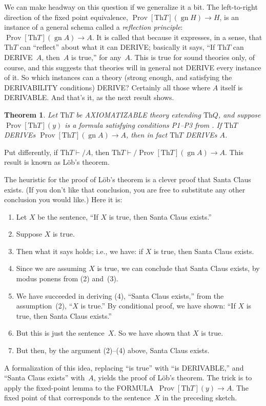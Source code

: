 \documentclass[10pt,a4paper]{article}
\makeatletter
\newcommand*{\olup}[1]{\MakeUppercase{#1}}
\theoremstyle{plain}
\newtheorem{thm}{Theorem}[section]
\theoremstyle{definition}
\theoremstyle{remark}
\newenvironment{explain}{}{}
\newcommand*{\ollabel}[1]{\label{#1}}
\newcommand{\olref}{\@ifnextchar[{\olref@i}{\olref@final}}
\def\olref@i[#1]{\@ifnextchar[{\olref@ii}{\olref@final}}
\def\olref@ii[#1]{\@ifnextchar[{\olref@iii}{\olref@final}}
\def\olref@iii[#1]{\olref@final}
\def\olref@final#1{\ref{#1}}
\providecommand{\lif}{\mathbin{\rightarrow}}
\providecommand{\Proves}{\mathrel{\vdash}}
\providecommand{\Th}{\ensuremath{\mathrm{Th}}}
\providecommand{\gn}{\operatorname{gn}}
\providecommand{\OProv}{\operatorname{Prov}}
\makeatother
\begin{document}
We can make headway on this question if we generalize it a bit. The
left-to-right direction of the fixed point equivalence,
$\OProv[\Th{T}](\gn{H}) \lif H$, is an instance of a general schema
called a \emph{reflection principle}: $\OProv[\Th{T}](\gn{A}) \lif A$.
It is called that because it expresses, in a sense, that $\Th{T}$ can
``reflect'' about what it can \olup{derive}; basically it says, ``If $\Th{T}$
can \olup{derive}~$A$, then~$A$ is true,'' for any~$A$.  This is true for
sound theories only, of course, and this suggests that theories will
in general not \olup{derive} every instance of it.  So which instances can a
theory (strong enough, and satisfying the \olup{derivability} conditions)
\olup{derive}?  Certainly all those where $A$ itself is \olup{derivable}. And that's
it, as the next result shows.

\begin{thm}\ollabel{thm:lob}
Let $\Th{T}$ be \olup{axiomatizable} theory extending $\Th{Q}$, and
suppose $\OProv[\Th{T}](y)$ is a formula satisfying conditions P1--P3 from
\olref[2in]{sec}. If $\Th{T}$ \olup{derive}s $\OProv[\Th{T}](\gn{A}) \lif A$,
then in fact $\Th{T}$ \olup{derive}s $A$.
\end{thm}

Put differently, if $\Th{T} \Proves/ A$, then $\Th{T} \Proves/
\OProv[\Th{T}](\gn{A}) \lif A$. This result is known as L\"ob's
theorem.

\begin{explain}
The heuristic for the proof of L\"ob's theorem is a clever proof that
Santa Claus exists. (If you don't like that conclusion, you are free
to substitute any other conclusion you would like.) Here it is:
\begin{enumerate}
\item Let $X$ be the sentence, ``If $X$ is true, then Santa Claus
  exists.''
\item Suppose $X$ is true.
\item Then what it says holds; i.e., we have: if $X$ is true, then
  Santa Claus exists.
\item Since we are assuming $X$ is true, we can conclude that
  Santa Claus exists, by modus ponens from (2) and~(3).
\item We have succeeded in deriving (4), ``Santa Claus exists,'' from
  the assumption~(2), ``$X$ is true.'' By conditional proof, we have
  shown: ``If $X$ is true, then Santa Claus exists.''
\item But this is just the sentence~$X$. So we have shown that $X$ is
  true.
\item But then, by the argument (2)--(4) above, Santa Claus exists.
\end{enumerate}
A formalization of this idea, replacing ``is true'' with ``is
\olup{derivable},'' and ``Santa Claus exists'' with~$A$, yields the proof of
L\"ob's theorem. The trick is to apply the fixed-point lemma to the
\olup{formula}~$\OProv[\Th{T}](y) \lif A$. The fixed point of that
corresponds to the sentence~$X$ in the preceding sketch.
\end{explain}
\end{document}
